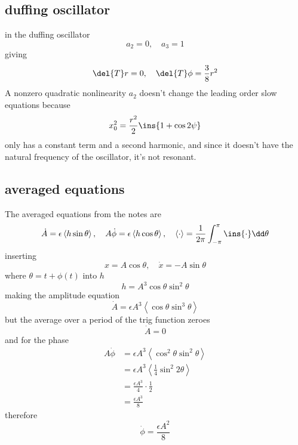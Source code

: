 \subsection{duffing oscillator}
in the duffing oscillator
\begin{equation}
    a_2=0,\quad a_3=1
\end{equation}
giving
\begin{equation}
    \del{T}r=0,\quad \del{T}\phi=\frac{3}{8}r^2
\end{equation}
A nonzero quadratic nonlinearity \(a_2\) doesn't change the leading order slow equations because 
\begin{equation}
    x_0^2=\frac{r^2}{2}\ins{1+\cos2\psi}
\end{equation}
only has a constant term and a second harmonic, and since it doesn't have the natural frequency of the oscillator, it's not resonant.
\subsection{averaged equations}
The averaged equations from the notes are 
\begin{equation}
    \dot{A}=\epsilon\left<h\sin\theta\right>,\quad A\dot{\phi}=\epsilon\left<h\cos\theta\right>, \quad \left<\cdot\right>=\frac{1}{2\pi}\int_{-\pi}^{\pi}\ins{\cdot}\dd\theta
\end{equation}
inserting 
\begin{equation}
    x=A\cos\theta,\quad\dot{x}=-A\sin\theta
\end{equation}
where \(\theta=t+\phi(t)\) into \(h\)
\begin{equation}
    h = A^3\cos\theta\sin^2\theta
\end{equation}
making the amplitude equation
\begin{equation}
    \dot{A}=\epsilon A^3 \left<\cos\theta\sin^3\theta\right>
\end{equation}
but the average over a period of the trig function zeroes
\begin{equation}
    \dot{A}=0
\end{equation}
and for the phase 
\begin{align}
    A\dot{\phi}&=\epsilon A^3\left<\cos^2\theta\sin^2\theta\right>\\
    &= \epsilon A^3\left<\frac{1}{4}\sin^2 2\theta\right>\\
    &= \frac{\epsilon A^3}{4}\cdot\frac{1}{2}\\
    &= \frac{\epsilon A^3}{8}
\end{align}
therefore 
\begin{equation}
    \dot{\phi} = \frac{\epsilon A^2}{8}
\end{equation}
